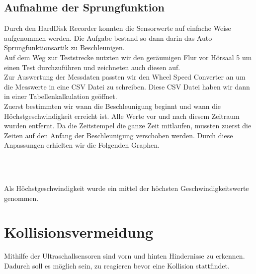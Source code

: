 \documentclass[a4paper,12pt]{report}
\begin{document}
	\section{Aufnahme der Sprungfunktion}
	Durch den HardDisk Recorder konnten die Sensorwerte auf einfache Weise aufgenommen werden. Die Aufgabe bestand so dann darin das Auto Sprungfunktionsartik zu Beschleunigen. \\
	Auf dem Weg zur Teststrecke nutzten wir den geräumigen Flur vor Hörsaal 5 um einen Test durchzuführen und zeichneten auch diesen auf. \\
	Zur Auswertung der Messdaten passten wir den Wheel Speed Converter an um die Messwerte in eine CSV Datei zu schreiben. Diese CSV Datei haben wir dann in einer Tabellenkalkulation geöffnet. \\
	Zuerst bestimmten wir wann die Beschleunigung beginnt und wann die Höchstgeschwindigkeit erreicht ist. Alle Werte vor und nach diesem Zeitraum wurden entfernt. Da die Zeitstempel die ganze Zeit mitlaufen, mussten zuerst die Zeiten auf den Anfang der Beschleunigung verschoben werden. Durch diese Anpassungen erhielten wir die Folgenden Graphen.\\
	\\
	\\
	Als Höchstgeschwindigkeit wurde ein mittel der höchsten Geschwindigkeitswerte genommen.
	

\chapter{Kollisionsvermeidung}

	Mithilfe %
	der Ultraschallsensoren sind vorn und hinten Hindernisse zu erkennen.
	Dadurch soll es möglich sein, zu reagieren bevor eine Kollision stattfindet.
\end{document}
